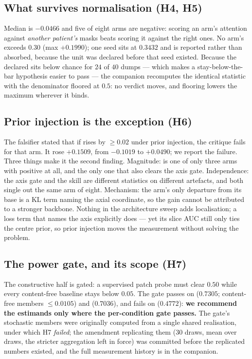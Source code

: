 \documentclass[conference]{IEEEtran}
\begin{document}
\subsection{What survives normalisation (H4, H5)}

Median \pss{} is $-0.0466$ and five of eight arms are negative: scoring an
arm's attention against \emph{another patient's} masks beats scoring it
against the right ones. No arm's \pns{} exceeds $0.30$ (max $+0.1990$); one
seed sits at $0.3432$ and is reported rather than absorbed, because the unit
was declared before that seed existed. Because the declared \attden{} sits
below chance for $24$ of $40$ dumps --- which makes a stay-below-the-bar
hypothesis easier to pass --- the companion recomputes the identical statistic
with the denominator floored at $0.5$: no verdict moves, and flooring lowers
the maximum wherever it binds.

\subsection{Prior injection is the exception (H6)}

The falsifier stated that if \pss{} rises by $\geq 0.02$ under prior
injection, the critique fails for that arm. It rose $+0.1509$, from $-0.1019$
to $+0.0490$; we report the failure. Three things make it the second finding.
Magnitude: \armNG{} is one of only three arms with positive \pss{} at all,
and the only one that also clears the axis gate. Independence: the axis gate
and the skill are different statistics on different artefacts, and both
single out the same arm of eight. Mechanism: the arm's only departure from
its base is a KL term naming the axial coordinate, so the gain cannot be
attributed to a stronger backbone. Nothing in the architecture sweep adds
localisation; a loss term that names the axis explicitly does --- yet its
slice AUC still only ties the centre prior, so prior injection moves the
measurement without solving the problem.

\subsection{The power gate, and its scope (H7)}

The constructive half is gated: a supervised patch probe must clear $0.50$
\pns{} while every content-free baseline stays below $0.05$. The gate passes
on \condA{} ($0.7305$; content-free members $\leq 0.0105$) and \condB{}
($0.7036$), and fails on \condC{} ($0.4772$): \textbf{we recommend the
estimands only where the per-condition gate passes.} The gate's stochastic
members were originally computed from a single shared realisation, under
which H7 \emph{failed}; the amendment replicating them ($30$ draws, mean over
draws, the stricter aggregation left in force) was committed before the
replicated numbers existed, and the full measurement history is in the
companion.
\end{document}
